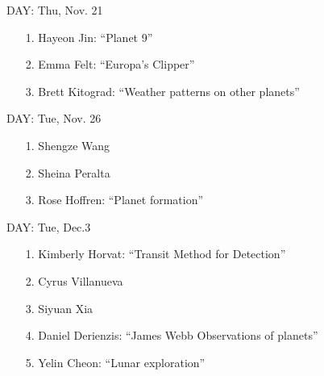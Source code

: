\documentclass[11pt]{article}
\begin{document}
DAY:  Thu, Nov. 21

\begin{itemize}

\item[1.] Hayeon Jin: ``Planet 9''

\item[2.] Emma Felt: ``Europa's Clipper''

\item[3.] Brett Kitograd: ``Weather patterns on other planets''

\end{itemize}


DAY:  Tue, Nov. 26

\begin{itemize}

\item[1.]  Shengze Wang

\item[2.] Sheina Peralta

\item[3.] Rose Hoffren: ``Planet formation'' 

\end{itemize}


DAY:  Tue, Dec.3

\begin{itemize}

\item[1.]  Kimberly Horvat: ``Transit Method for Detection'' 

\item[2.] Cyrus Villanueva

\item[3.] Siyuan Xia

\item[4.] Daniel Derienzis: ``James Webb Observations of planets''

\item[5.] Yelin Cheon: ``Lunar exploration''  
  
  

\end{itemize}







\end{document}
